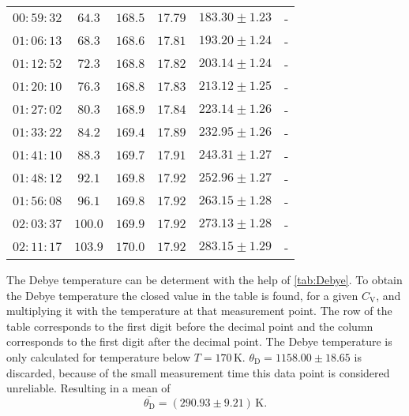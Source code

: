 \begin{table}[H]
\begin{tabular}{c c c c c c}
          $00:59:32$  &  $64.3$ &    $168.5$ &   $ 17.79$  & $183.30 \pm 1.23$&-                       \\    
          $01:06:13$  &  $68.3$ &    $168.6$ &   $ 17.81$  & $193.20 \pm 1.24$&-                       \\    
          $01:12:52$  &  $72.3$ &    $168.8$ &   $ 17.82$  & $203.14 \pm 1.24$&-                       \\    
          $01:20:10$  &  $76.3$ &    $168.8$ &   $ 17.83$  & $213.12 \pm 1.25$&-                       \\    
          $01:27:02$  &  $80.3$ &    $168.9$ &   $ 17.84$  & $223.14 \pm 1.26$&-                       \\    
          $01:33:22$  &  $84.2$ &    $169.4$ &   $ 17.89$  & $232.95 \pm 1.26$&-                       \\    
          $01:41:10$  &  $88.3$ &    $169.7$ &   $ 17.91$  & $243.31 \pm 1.27$&-                       \\    
          $01:48:12$  &  $92.1$ &    $169.8$ &   $ 17.92$  & $252.96 \pm 1.27$&-                       \\    
          $01:56:08$  &  $96.1$ &    $169.8$ &   $ 17.92$  & $263.15 \pm 1.28$&-                       \\    
          $02:03:37$  &  $100.0$&    $169.9$ &   $ 17.92$  & $273.13 \pm 1.28$&-                       \\   
          $02:11:17$  &  $103.9$&    $170.0$ &   $ 17.92$  & $283.15 \pm 1.29$&-                       \\   
    \bottomrule
    \end{tabular}
    \end{table}


The Debye temperature can be determent with the help of \autoref{tab:Debye}.
To obtain the Debye temperature the closed value in the table is found, for a given $C_\text{V}$, and multiplying it with the temperature at that measurement point.
The row of the table corresponds to the first digit before the decimal point and the column corresponds
to the first digit after the decimal point. 
The Debye temperature is only calculated for temperature below $T = 170 \, \unit{\kelvin}$.
$\theta_\text{D} = 1158.00\pm 18.65$ is discarded, because of the small measurement time this data point is considered unreliable.
Resulting in a mean of 
\begin{equation*}
    \bar{\theta_\text{D}} = \left( 290.93 \pm  9.21 \right) \,  \unit{\kelvin}.
\end{equation*}

